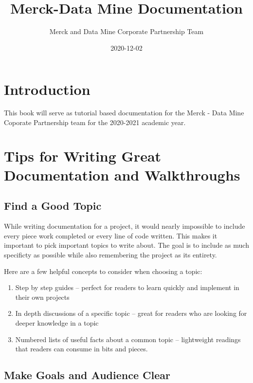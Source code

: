 \documentclass[]{book}
\title{Merck-Data Mine Documentation}
\author{Merck and Data Mine Corporate Partnership Team}
\date{2020-12-02}
\begin{document}
\maketitle

{
\setcounter{tocdepth}{1}
\tableofcontents
}
\chapter{Introduction}\label{introduction}

This book will serve as tutorial based documentation for the Merck -
Data Mine Coporate Partnership team for the 2020-2021 academic year.

\chapter{Tips for Writing Great Documentation and
Walkthroughs}\label{tips-for-writing-great-documentation-and-walkthroughs}

\section{Find a Good Topic}\label{find-a-good-topic}

While writing documentation for a project, it would nearly impossible to
include every piece work completed or every line of code written. This
makes it important to pick important topics to write about. The goal is
to include as much specificty as possible while also remembering the
project as its entirety.

Here are a few helpful concepts to consider when choosing a topic:

\begin{enumerate}
\def\labelenumi{\arabic{enumi}.}
\item
  Step by step guides -- perfect for readers to learn quickly and
  implement in their own projects
\item
  In depth discussions of a specific topic -- great for readers who are
  looking for deeper knowledge in a topic
\item
  Numbered lists of useful facts about a common topic -- lightweight
  readings that readers can consume in bits and pieces.
\end{enumerate}

\section{Make Goals and Audience
Clear}\label{make-goals-and-audience-clear}
\end{document}

